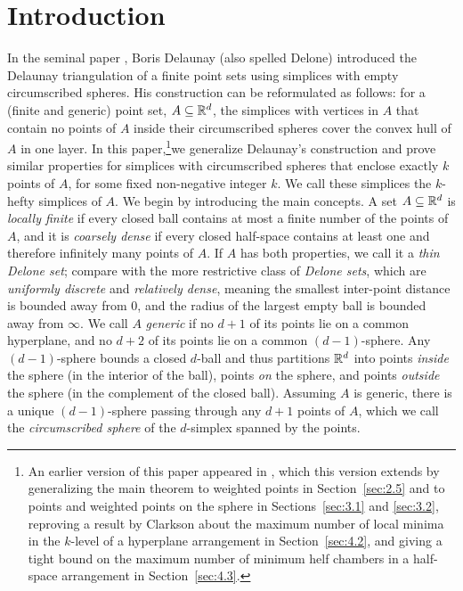 \documentclass[a4paper,UKenglish,cleveref, autoref,numberwithinsect]{socg-lipics-v2021}
\newcommand {\mm}[1] {\ifmmode{#1}\else{\mbox{\(#1\)}}\fi}
\theoremstyle{plain}
\newcommand{\Rspace}        {\mm{{\mathbb R}}}
\begin{document}
\section{Introduction}
\label{sec:1}
In the seminal paper \cite{Del34}, Boris Delaunay (also spelled Delone) introduced the Delaunay triangulation of a finite point sets using simplices with empty circumscribed spheres. 
His construction can be reformulated as follows: 
for a (finite and generic) point set, $A \subseteq \Rspace^d$, the simplices with vertices in $A$ that contain no points of $A$ inside their circumscribed spheres cover the convex hull of $A$ in one layer.
In this paper,\footnote{An earlier version of this paper appeared in \cite{EGS25}, which this version extends by generalizing the main theorem to weighted points in Section~\ref{sec:2.5} and to points and weighted points on the sphere in Sections~\ref{sec:3.1} and \ref{sec:3.2}, reproving a result by Clarkson about the maximum number of local minima in the $k$-level of a hyperplane arrangement in Section~\ref{sec:4.2}, and giving a tight bound on the maximum number of minimum helf chambers in a half-space arrangement in Section~\ref{sec:4.3}.}we generalize Delaunay's construction and prove similar properties for simplices with circumscribed spheres that enclose exactly $k$ points of $A$, for some fixed non-negative integer $k$.
We call these simplices the $k$-hefty simplices of $A$. 
\smallskip
We begin by introducing the main concepts.
A set $A \subseteq \Rspace^d$ is \emph{locally finite} if every closed ball contains at most a finite number of the points of $A$, and it is \emph{coarsely dense} if every closed half-space contains at least one and therefore infinitely many points of $A$.
If $A$ has both properties, we call it a \emph{thin Delone set}; compare with the more restrictive class of \emph{Delone sets}, which are \emph{uniformly discrete} and \emph{relatively dense}, meaning the smallest inter-point distance is bounded away from $0$, and the radius of the largest empty ball is bounded away from $\infty$.
We call $A$ \emph{generic} if no $d+1$ of its points lie on a common hyperplane, and no $d+2$ of its points lie on a common $(d-1)$-sphere.
Any $(d-1)$-sphere bounds a closed $d$-ball and thus partitions $\Rspace^d$ into points \emph{inside} the sphere (in the interior of the ball), points \emph{on} the sphere, and points \emph{outside} the sphere (in the complement of the closed ball).
Assuming $A$ is generic, there is a unique $(d-1)$-sphere passing through any $d+1$ points of $A$, which we call the \emph{circumscribed sphere} of the $d$-simplex spanned by the points.
\end{document}
